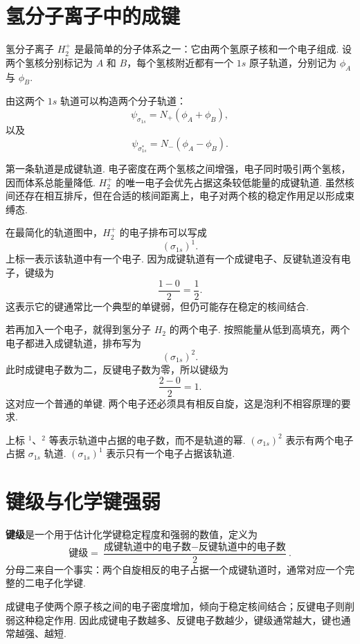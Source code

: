 \documentclass[UTF8,11pt,a4paper,openany]{ctexbook}
\newcommand{\term}[1]{\textbf{#1}}
\begin{document}
\section{氢分子离子中的成键}

氢分子离子 $H_2^+$ 是最简单的分子体系之一：它由两个氢原子核和一个电子组成. 设两个氢核分别标记为 $A$ 和 $B$，每个氢核附近都有一个 $1s$ 原子轨道，分别记为 $\phi_A$ 与 $\phi_B$. 

由这两个 $1s$ 轨道可以构造两个分子轨道：
\[
\psi_{\sigma_{1s}}
=N_+(\phi_A+\phi_B),
\]
以及
\[
\psi_{\sigma_{1s}^*}
=N_-(\phi_A-\phi_B).
\]

第一条轨道是成键轨道. 电子密度在两个氢核之间增强，电子同时吸引两个氢核，因而体系总能量降低. $H_2^+$ 的唯一电子会优先占据这条较低能量的成键轨道. 虽然核间还存在相互排斥，但在合适的核间距离上，电子对两个核的稳定作用足以形成束缚态. 

\begin{examplebox}
在最简化的轨道图中，$H_2^+$ 的电子排布可以写成
\[
(\sigma_{1s})^1.
\]
上标一表示该轨道中有一个电子. 因为成键轨道有一个成键电子、反键轨道没有电子，键级为
\[
\frac{1-0}{2}=\frac12.
\]
这表示它的键通常比一个典型的单键弱，但仍可能存在稳定的核间结合. 
\end{examplebox}

若再加入一个电子，就得到氢分子 $H_2$ 的两个电子. 按照能量从低到高填充，两个电子都进入成键轨道，排布写为
\[
(\sigma_{1s})^2.
\]
此时成键电子数为二，反键电子数为零，所以键级为
\[
\frac{2-0}{2}=1.
\]
这对应一个普通的单键. 两个电子还必须具有相反自旋，这是泡利不相容原理的要求. 

\begin{notationbox}
上标 $^1$、$^2$ 等表示轨道中占据的电子数，而不是轨道的幂. $(\sigma_{1s})^2$ 表示有两个电子占据 $\sigma_{1s}$ 轨道. $(\sigma_{1s})^1$ 表示只有一个电子占据该轨道. 
\end{notationbox}

\section{键级与化学键强弱}

\begin{definitionbox}
\term{键级}是一个用于估计化学键稳定程度和强弱的数值，定义为
\[
\text{键级}
=\frac{\text{成键轨道中的电子数}
-\text{反键轨道中的电子数}}{2}.
\]
分母二来自一个事实：两个自旋相反的电子占据一个成键轨道时，通常对应一个完整的二电子化学键. 
\end{definitionbox}

成键电子使两个原子核之间的电子密度增加，倾向于稳定核间结合；反键电子则削弱这种稳定作用. 因此成键电子数越多、反键电子数越少，键级通常越大，键也通常越强、越短. 
\end{document}
